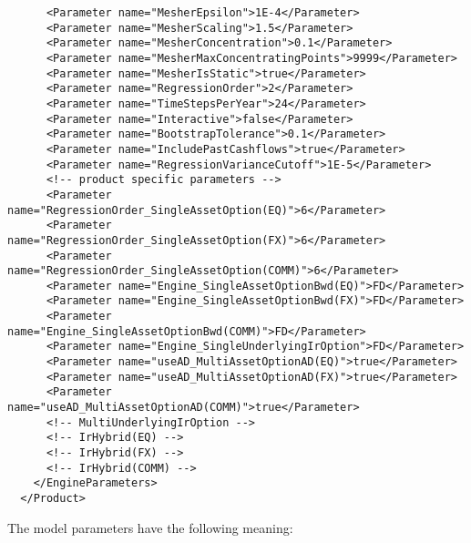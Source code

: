 \begin{verbatim}
      <Parameter name="MesherEpsilon">1E-4</Parameter>
      <Parameter name="MesherScaling">1.5</Parameter>
      <Parameter name="MesherConcentration">0.1</Parameter>
      <Parameter name="MesherMaxConcentratingPoints">9999</Parameter>
      <Parameter name="MesherIsStatic">true</Parameter>
      <Parameter name="RegressionOrder">2</Parameter>
      <Parameter name="TimeStepsPerYear">24</Parameter>
      <Parameter name="Interactive">false</Parameter>
      <Parameter name="BootstrapTolerance">0.1</Parameter>
      <Parameter name="IncludePastCashflows">true</Parameter>
      <Parameter name="RegressionVarianceCutoff">1E-5</Parameter>
      <!-- product specific parameters -->
      <Parameter name="RegressionOrder_SingleAssetOption(EQ)">6</Parameter>
      <Parameter name="RegressionOrder_SingleAssetOption(FX)">6</Parameter>
      <Parameter name="RegressionOrder_SingleAssetOption(COMM)">6</Parameter>
      <Parameter name="Engine_SingleAssetOptionBwd(EQ)">FD</Parameter>
      <Parameter name="Engine_SingleAssetOptionBwd(FX)">FD</Parameter>
      <Parameter name="Engine_SingleAssetOptionBwd(COMM)">FD</Parameter>
      <Parameter name="Engine_SingleUnderlyingIrOption">FD</Parameter>
      <Parameter name="useAD_MultiAssetOptionAD(EQ)">true</Parameter>
      <Parameter name="useAD_MultiAssetOptionAD(FX)">true</Parameter>
      <Parameter name="useAD_MultiAssetOptionAD(COMM)">true</Parameter>
      <!-- MultiUnderlyingIrOption -->
      <!-- IrHybrid(EQ) -->
      <!-- IrHybrid(FX) -->
      <!-- IrHybrid(COMM) -->
    </EngineParameters>
  </Product>
\end{verbatim}

The model parameters have the following meaning:

